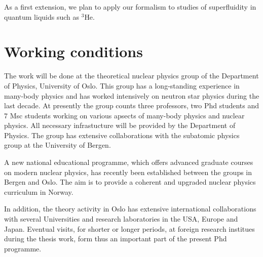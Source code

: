 \documentclass{svmult}
\begin{document}
As a first extension, we plan to apply our formalism to studies
of superfluidity in quantum liquids
such as $^3$He.

\section{Working conditions}
The work will be done at  the theoretical 
nuclear physics group of the
Department of Physics, University of Oslo. This
group has a long-standing experience in many-body physics
and has worked intensively on neutron star physics during the 
last decade. At presently the group counts  three professors, 
two Phd students 
and 7 Msc students
working on various
apsects of many-body physics and nuclear physics. 
All necessary infrastucture will be provided
by the Department of Physics.
The group has extensive collaborations with the subatomic physics
group at the University of Bergen. 

A new national educational programme, which offers advanced graduate
courses on modern nuclear physics, has recently been established between
the groups in Bergen and Oslo. The aim is to provide a coherent and
upgraded nuclear physics curriculum in Norway.  

In addition, the theory activity in Oslo has extensive
international collaborations with several Universities and research 
laboratories in the USA, Europe and Japan. 
Eventual visits, for shorter
or longer periods, at foreign research institues
during the thesis work, form thus an important part of the 
present Phd programme.
\end{document}
